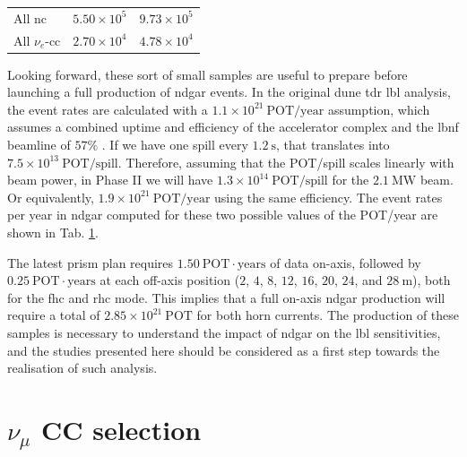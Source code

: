 \begin{table}[t]
\begin{center}
\begin{small}
\begin{tabular}{lcc}
            All \gls{nc}                            & $5.50 \times 10^{5}$                              & $9.73 \times 10^{5}$                              \\[2mm]
            All $\nu_{e}$-\gls{cc}                  & $2.70 \times 10^{4}$                              & $4.78 \times 10^{4}$                             
            \end{tabular}
		\end{small}
	\end{center}
	\label{tab:ndgar_event_rates}
\end{table}

Looking forward, these sort of small samples are useful to prepare before launching a full production of \gls{ndgar} events. In the original \gls{dune} \gls{tdr} \gls{lbl} analysis, the event rates are calculated with a $1.1 \times 10^{21} ~ \mathrm{POT}/\mathrm{year}$ assumption, which assumes a combined uptime and efficiency of the accelerator complex and the \gls{lbnf} beamline of $57\%$ \cite{DUNE2020}. If we have one spill every $1.2~\mathrm{s}$, that translates into $7.5 \times 10^{13} ~ \mathrm{POT}/\mathrm{spill}$. Therefore, assuming that the POT/spill scales linearly with beam power, in Phase II we will have $1.3 \times 10^{14} ~ \mathrm{POT}/\mathrm{spill}$ for the $2.1 ~ \mathrm{MW}$ beam. Or equivalently, $1.9 \times 10^{21} ~ \mathrm{POT}/\mathrm{year}$ using the same efficiency. The event rates per year in \gls{ndgar} computed for these two possible values of the POT/year are shown in Tab. \ref{tab:ndgar_event_rates}.

The latest \gls{prism} plan requires $1.50 ~ \mathrm{POT} \cdot \mathrm{years}$ of data on-axis, followed by $0.25 ~ \mathrm{POT} \cdot \mathrm{years}$ at each off-axis position ($2$, $4$, $8$, $12$, $16$, $20$, $24$, and $28~\mathrm{m}$), both for the \gls{fhc} and \gls{rhc} mode. This implies that a full on-axis \gls{ndgar} production will require a total of $2.85 \times 10^{21}~\mathrm{POT}$ for both horn currents. The production of these samples is necessary to understand the impact of \gls{ndgar} on the \gls{lbl} sensitivities, and the studies presented here should be considered as a first step towards the realisation of such analysis.

\section[\texorpdfstring{$\nu_{\mu}$}{numu} CC selection]{\boldmath\texorpdfstring{$\nu_{\mu}$}{numu} CC selection}
\label{sec:gar_numu_cc}


